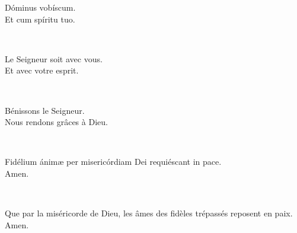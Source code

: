 \documentclass[twoside]{article}
\begin{document}
\begin{paracol}[1]{2}
\vv Dóminus vobíscum. \\
\rr Et cum spíritu tuo.

~~


\switchcolumn

\vv Le Seigneur soit avec vous. \\
\rr Et avec votre esprit.

~~

\vv Bénissons le Seigneur. \\
\rr Nous rendons grâces à Dieu.

\switchcolumn*

~~

\vv Fidélium ánimæ per misericórdiam Dei requiéscant in pace. \\
\rr Amen.

\switchcolumn

~~

\vv Que par la miséricorde de Dieu, les âmes des fidèles trépassés reposent en paix. \\
\rr Amen.

\end{paracol}
\end{document}
